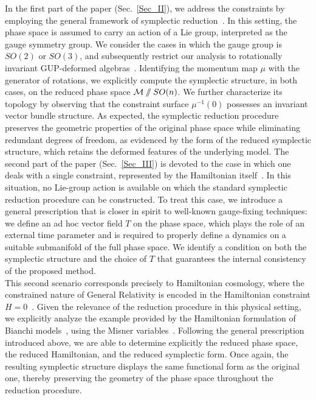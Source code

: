 \documentclass{article}
\numberwithin{equation}{section}
\theoremstyle{definition}
\newcommand{\sslash}{\mathbin{/\mkern-6mu/}}
\begin{document}
\smallskip
In the first part of the paper (Sec.~\ref{Sec_II}), we address the constraints by employing the general framework of symplectic reduction~\cite{marsden1974reduction}. In this setting, the phase space is assumed to carry an action of a Lie group, interpreted as the gauge symmetry group. We consider the cases in which the gauge group is $SO(2)$ or $SO(3)$, and subsequently restrict our analysis to rotationally invariant GUP-deformed algebras~\cite{Bruno_Segreto_2024, Maggiore:1993kv}.
Identifying the momentum map $\mu$ with the generator of rotations, we explicitly compute the symplectic structure, in both cases, on the reduced phase space $\mathcal{M} \sslash SO(n)$. We further characterize its topology by observing that the constraint surface $\mu^{-1}(0)$ possesses an invariant vector bundle structure. As expected, the symplectic reduction procedure preserves the geometric properties of the original phase space while eliminating redundant degrees of freedom, as evidenced by the form of the reduced symplectic structure, which retains the deformed features of the underlying model.
\smallskip
The second part of the paper (Sec.~\ref{Sec_III}) is devoted to the case in which one deals with a single constraint, represented by the Hamiltonian itself~\cite{Henneaux:1992ig}. In this situation, no Lie-group action is available on which the standard symplectic reduction procedure can be constructed. To treat this case, we introduce a general prescription that is closer in spirit to well-known gauge-fixing techniques: we define an ad hoc vector field $T$ on the phase space, which plays the role of an external time parameter and is required to properly define a dynamics on a suitable submanifold of the full phase space. We identify a condition on both the symplectic structure and the choice of $T$ that guarantees the internal consistency of the proposed method.\\
This second scenario corresponds precisely to Hamiltonian cosmology, where the constrained nature of General Relativity is encoded in the Hamiltonian constraint $H = 0$~\cite{Arnowitt:1962hi, Misner:1969ae}. Given the relevance of the reduction procedure in this physical setting, we explicitly analyze the example provided by the Hamiltonian formulation of Bianchi models~\cite{ellis2006bianchi}, using the Misner variables~\cite{Misner:1969ae}. Following the general prescription introduced above, we are able to determine explicitly the reduced phase space, the reduced Hamiltonian, and the reduced symplectic form. Once again, the resulting symplectic structure displays the same functional form as the original one, thereby preserving the geometry of the phase space throughout the reduction procedure.\\
\end{document}
